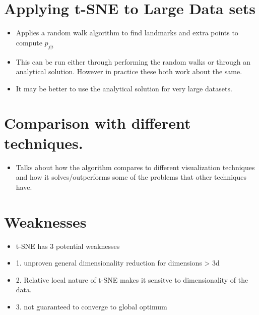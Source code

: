 \documentclass[11pt]{article}
\begin{document}
\section{Applying t-SNE to Large Data sets}
\label{sec:org9a140ff}
\begin{itemize}
\item Applies a random walk algorithm to find landmarks and extra points to compute \(p_{j|i}\)
\item This can be run either through performing the random walks or through an analytical solution. However in practice these both work about the same.
\item It may be better to use the analytical solution for very large datasets.
\end{itemize}
\section{Comparison with different techniques.}
\label{sec:org7a098f9}
\begin{itemize}
\item Talks about how the algorithm compares to different visualization techniques and how it solves/outperforms some of the problems that other techniques have.
\end{itemize}
\section{Weaknesses}
\label{sec:org84cbaf4}
\begin{itemize}
\item t-SNE has 3 potential weaknesses
\item 1. unproven general dimensionality reduction for dimensions > 3d
\item 2. Relative local nature of t-SNE makes it sensitve to dimensionality of the data.
\item 3. not guaranteed to converge to global optimum
\end{itemize}
\end{document}
